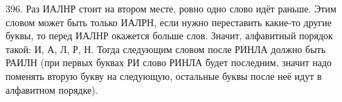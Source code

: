 396. Раз ИАЛНР стоит на втором месте, ровно одно слово идёт раньше. Этим словом может быть только ИАЛРН, если нужно переставить какие-то другие буквы, то перед ИАЛНР окажется больше слов. Значит, алфавитный порядок такой: И, А, Л, Р, Н. Тогда следующим словом после РИНЛА должно быть РАИЛН (при первых буквах РИ слово РИНЛА будет последним, значит надо поменять вторую букву на следующую, остальные буквы после неё идут в алфавитном порядке).
 